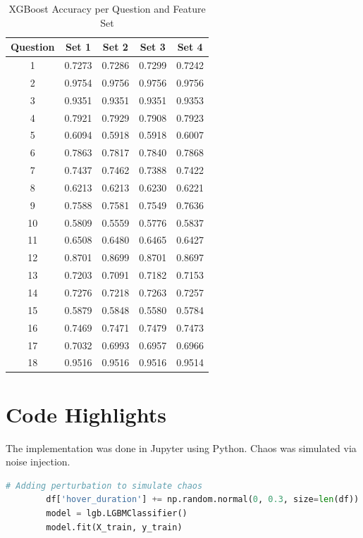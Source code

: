 \documentclass[12pt]{article}
\begin{document}
\begin{table}[H]
\centering
\small
\caption{XGBoost Accuracy per Question and Feature Set}
\begin{tabular}{c|cccc}
\toprule
\textbf{Question} & \textbf{Set 1} & \textbf{Set 2} & \textbf{Set 3} & \textbf{Set 4} \\
\midrule
1  & 0.7273 & 0.7286 & 0.7299 & 0.7242 \\
2  & 0.9754 & 0.9756 & 0.9756 & 0.9756 \\
3  & 0.9351 & 0.9351 & 0.9351 & 0.9353 \\
4  & 0.7921 & 0.7929 & 0.7908 & 0.7923 \\
5  & 0.6094 & 0.5918 & 0.5918 & 0.6007 \\
6  & 0.7863 & 0.7817 & 0.7840 & 0.7868 \\
7  & 0.7437 & 0.7462 & 0.7388 & 0.7422 \\
8  & 0.6213 & 0.6213 & 0.6230 & 0.6221 \\
9  & 0.7588 & 0.7581 & 0.7549 & 0.7636 \\
10 & 0.5809 & 0.5559 & 0.5776 & 0.5837 \\
11 & 0.6508 & 0.6480 & 0.6465 & 0.6427 \\
12 & 0.8701 & 0.8699 & 0.8701 & 0.8697 \\
13 & 0.7203 & 0.7091 & 0.7182 & 0.7153 \\
14 & 0.7276 & 0.7218 & 0.7263 & 0.7257 \\
15 & 0.5879 & 0.5848 & 0.5580 & 0.5784 \\
16 & 0.7469 & 0.7471 & 0.7479 & 0.7473 \\
17 & 0.7032 & 0.6993 & 0.6957 & 0.6966 \\
18 & 0.9516 & 0.9516 & 0.9516 & 0.9514 \\
\bottomrule
\end{tabular}
\label{tab:xgb_metrics}
\end{table}
	
	\section{Code Highlights}
	The implementation was done in Jupyter using Python. Chaos was simulated via noise injection.
	
	\begin{lstlisting}[language=Python, caption=Injecting Perturbations, basicstyle=\ttfamily\small]
		# Adding perturbation to simulate chaos
		df['hover_duration'] += np.random.normal(0, 0.3, size=len(df))
		model = lgb.LGBMClassifier()
		model.fit(X_train, y_train)
	\end{lstlisting}
	
\end{document}
